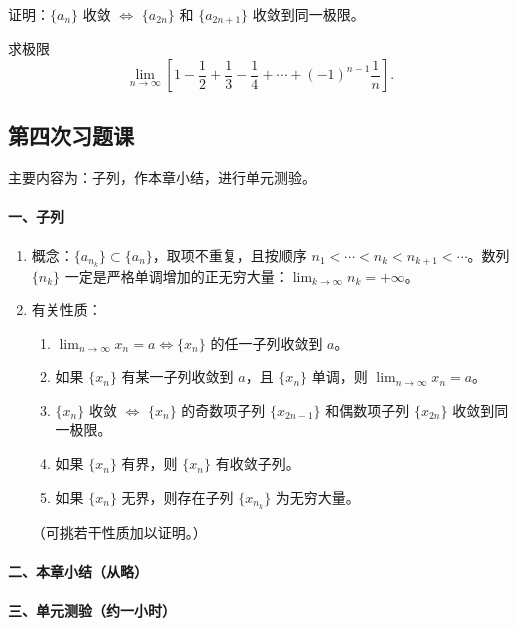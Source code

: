 \begin{xexercise}[3]
证明：$\{a_n\}$ 收敛 $\Longleftrightarrow$ $\{a_{2n}\}$ 和 $\{a_{2n+1}\}$ 收敛到同一极限。
\end{xexercise}

\begin{xexercise}[4]
求极限
  \[
    \lim_{n\to\infty}\left[1-\frac12+\frac13-\frac14+\cdots+(-1)^{n-1}\frac1n\right].
  \]
\end{xexercise}

\subsection{第四次习题课}

主要内容为：子列，作本章小结，进行单元测验。

\paragraph{一、子列}

\begin{enumerate}[label=\arabic*.]
  \item 概念：$\{a_{n_k}\}\subset\{a_n\}$，取项不重复，且按顺序 $n_1<\cdots<n_k<n_{k+1}<\cdots$。数列 $\{n_k\}$ 一定是严格单调增加的正无穷大量：$\displaystyle\lim_{k\to\infty}n_k=+\infty$。
  \item 有关性质：
  \begin{enumerate}[label=(\arabic*)]
    \item $\displaystyle\lim_{n\to\infty}x_n=a\Longleftrightarrow\{x_n\}$ 的任一子列收敛到 $a$。
    \item 如果 $\{x_n\}$ 有某一子列收敛到 $a$，且 $\{x_n\}$ 单调，则 $\displaystyle\lim_{n\to\infty}x_n=a$。
    \item $\{x_n\}$ 收敛 $\Longleftrightarrow$ $\{x_n\}$ 的奇数项子列 $\{x_{2n-1}\}$ 和偶数项子列 $\{x_{2n}\}$ 收敛到同一极限。
    \item 如果 $\{x_n\}$ 有界，则 $\{x_n\}$ 有收敛子列。
    \item 如果 $\{x_n\}$ 无界，则存在子列 $\{x_{n_k}\}$ 为无穷大量。
  \end{enumerate}
  （可挑若干性质加以证明。）
\end{enumerate}

\paragraph{二、本章小结（从略）}

\paragraph{三、单元测验（约一小时）}

